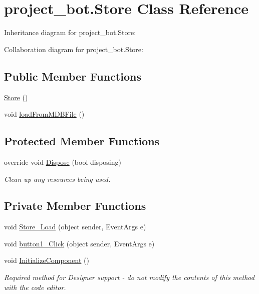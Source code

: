 \hypertarget{classproject__bot_1_1_store}{}\section{project\+\_\+bot.\+Store Class Reference}
\label{classproject__bot_1_1_store}


Inheritance diagram for project\+\_\+bot.\+Store\+:


Collaboration diagram for project\+\_\+bot.\+Store\+:
\subsection*{Public Member Functions}
\begin{DoxyCompactItemize}
\item 
\hyperlink{classproject__bot_1_1_store_a976f5080cbc11032a96aace4925c61a9}{Store} ()
\item 
void \hyperlink{classproject__bot_1_1_store_aae062aa9b620a02c4ccb9ab8409eb8bc}{load\+From\+M\+D\+B\+File} ()
\end{DoxyCompactItemize}
\subsection*{Protected Member Functions}
\begin{DoxyCompactItemize}
\item 
override void \hyperlink{classproject__bot_1_1_store_abc4be67dcd1d8772c07baa6fe1a393eb}{Dispose} (bool disposing)
\begin{DoxyCompactList}\small\item\em Clean up any resources being used. \end{DoxyCompactList}\end{DoxyCompactItemize}
\subsection*{Private Member Functions}
\begin{DoxyCompactItemize}
\item 
void \hyperlink{classproject__bot_1_1_store_a72c22ca4fb81518a9de8a519badd7e52}{Store\+\_\+\+Load} (object sender, Event\+Args e)
\item 
void \hyperlink{classproject__bot_1_1_store_a0a4530e8cbd5bb73b2e9c6aeb41b74d1}{button1\+\_\+\+Click} (object sender, Event\+Args e)
\item 
void \hyperlink{classproject__bot_1_1_store_a4b1bdbb3b9e66dedb0ae4d7b91884cdf}{Initialize\+Component} ()
\begin{DoxyCompactList}\small\item\em Required method for Designer support -\/ do not modify the contents of this method with the code editor. \end{DoxyCompactList}\end{DoxyCompactItemize}
